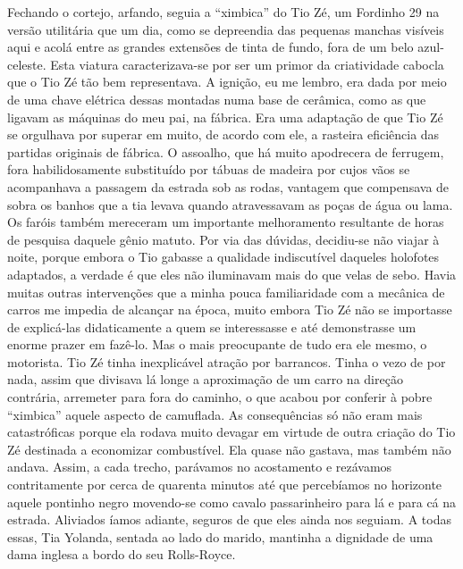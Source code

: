 Fechando o cortejo, arfando, seguia a ``ximbica'' do Tio Zé, um Fordinho 29 na versão utilitária que um dia, como se depreendia das pequenas manchas visíveis aqui e acolá entre as grandes extensões de tinta de fundo, fora de um belo azul-celeste.
Esta viatura caracterizava-se por ser um primor da criatividade cabocla que o Tio Zé tão bem representava.
A ignição, eu me lembro, era dada por meio de uma chave elétrica dessas montadas numa base de cerâmica, como as que ligavam as máquinas do meu pai, na fábrica.
Era uma adaptação de que Tio Zé se orgulhava por superar em muito, de acordo com ele, a rasteira eficiência das partidas originais de fábrica.
O assoalho, que há muito apodrecera de ferrugem, fora habilidosamente substituído por tábuas de madeira por cujos vãos se acompanhava a passagem da estrada sob as rodas, vantagem que compensava de sobra os banhos que a tia levava quando atravessavam as poças de água ou lama.
Os faróis também mereceram um importante melhoramento resultante de horas de pesquisa daquele gênio matuto.
Por via das dúvidas, decidiu-se não viajar à noite, porque embora o Tio gabasse a qualidade indiscutível daqueles holofotes adaptados, a verdade é que eles não iluminavam mais do que velas de sebo.
Havia muitas outras intervenções que a minha pouca familiaridade com a mecânica de carros me impedia de alcançar na época, muito embora Tio Zé não se importasse de explicá-las didaticamente a quem se interessasse e até demonstrasse um enorme prazer em fazê-lo.
Mas o mais preocupante de tudo era ele mesmo, o motorista.
Tio Zé tinha inexplicável atração por barrancos.
Tinha o vezo de por nada, assim que divisava lá longe a aproximação de um carro na direção contrária, arremeter para fora do caminho, o que acabou por conferir à pobre ``ximbica'' aquele aspecto de camuflada.
As consequências só não eram mais catastróficas porque ela rodava muito devagar em virtude de outra criação do Tio Zé destinada a economizar combustível.
Ela quase não gastava, mas também não andava.
Assim, a cada trecho, parávamos no acostamento e rezávamos contritamente por cerca de quarenta minutos até que percebíamos no horizonte aquele pontinho negro movendo-se como cavalo passarinheiro para lá e para cá na estrada.
Aliviados íamos adiante, seguros de que eles ainda nos seguiam.
A todas essas, Tia Yolanda, sentada ao lado do marido, mantinha a dignidade de uma dama inglesa a bordo do seu Rolls-Royce.

